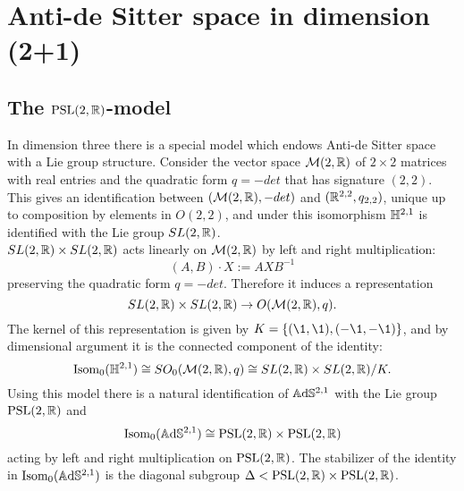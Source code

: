 \chapter{Anti-de Sitter space in dimension (2+1)} \label{chapter:3}

\section{The $\text{PSL}(2,\mathbb{R})$-model}
In dimension three there is a special model which endows Anti-de Sitter space with a Lie group structure.
Consider the vector space $\mathcal{M}(2,\mathbb{R})$ of $2 \times 2$ matrices with real entries and the quadratic form $q= -det$ that has signature $(2,2)$.
This gives an identification between $(\mathcal{M}(2,\mathbb{R}), -det)$ and $(\mathbb{R}^{2,2},q_{2,2})$, unique up to composition by elements in $O(2,2)$, and under this isomorphism $\mathbb{H}^{2,1}$ is identified with the Lie group $SL(2,\mathbb{R})$.\\
$SL(2,\mathbb{R})\times SL(2,\mathbb{R})$ acts linearly on $\mathcal{M}(2,\mathbb{R})$ by left and right multiplication:
\[
    (A,B) \cdot X := AXB^{-1}    
\]
preserving the quadratic form $q = -det$. Therefore it induces a representation
\[
    SL(2,\mathbb{R})\times SL(2,\mathbb{R}) \to O(\mathcal{M}(2,\mathbb{R}),q).
\]
The kernel of this representation is given by $K=\{ (\1,\1),(-\1,-\1) \}$, and by dimensional argument it is the connected component of the identity:
\[
    \text{Isom}_0(\mathbb{H}^{2,1}) \cong SO_0(\mathcal{M}(2,\mathbb{R}),q) \cong SL(2,\mathbb{R})\times SL(2,\mathbb{R}) / K.
\]
Using this model there is a natural identification of $\mathbb{A}\mathrm{d}\mathbb{S}^{2,1}$ with the Lie group $\text{PSL}(2,\mathbb{R})$ and
\[
    \text{Isom}_0(\mathbb{A}\mathrm{d}\mathbb{S}^{2,1}) \cong \text{PSL}(2,\mathbb{R}) \times \text{PSL}(2,\mathbb{R})
\]
acting by left and right multiplication on $\text{PSL}(2,\mathbb{R})$.
The stabilizer of the identity in $\text{Isom}_0(\mathbb{A}\mathrm{d}\mathbb{S}^{2,1})$ is the diagonal subgroup $\Delta < \text{PSL}(2,\mathbb{R}) \times \text{PSL}(2,\mathbb{R})$.\\

